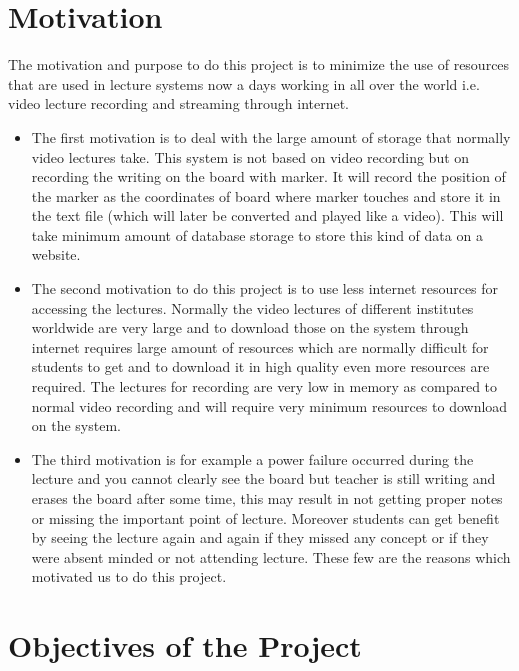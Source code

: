\section{Motivation}
The motivation and purpose to do this project is to minimize the use of resources that are used in lecture systems now a days working in all over the world i.e. video lecture recording and streaming through internet. 

\begin{itemize}

\item The first motivation is to deal with the large amount of storage that normally video lectures take. This system is not based on video recording but on recording the writing on the board with marker. It will record the position of the marker as the coordinates of board where marker touches and store it in the text file (which will later be converted and played like a video). This will take minimum amount of database storage to store this kind of data on a website.

\item The second motivation to do this project is to use less internet resources for accessing the lectures. Normally the video lectures of different institutes worldwide are very large and to download those on the system through internet requires large amount of resources which are normally difficult for students to get and to download it in high quality even more resources are required. The lectures for recording are very low in memory as compared to normal video recording and will require very minimum resources to download on the system.

\item The third motivation is for example a power failure occurred during the lecture and you cannot clearly see the board but teacher is still writing and erases the board after some time, this may result in not getting proper notes or missing the important point of lecture. Moreover students can get benefit by seeing the lecture again and again if they missed any concept or if they were absent minded or not attending lecture. These few are the reasons which motivated us to do this project.

\end{itemize}


\bigskip
\section{Objectives of the Project}
\bigskip
